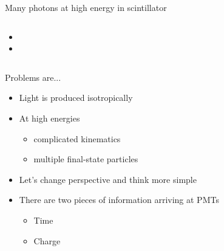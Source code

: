 \documentclass[14pt]{beamer}
\begin{document}
\begin{frame}{Many photons at high energy in scintillator}
\begin{columns}[T]
\begin{block}{}
			\begin{itemize}
				\item<3-> {\fontsize{10pt}{10pt}}
				\item<4-> {\fontsize{10pt}{10pt}\selectfont{fitters must to be
					robust against these statistical outliers}}
			\end{itemize}
		\end{block}
	\end{columns}
\end{frame}

\begin{frame}{Problems are...}
	\begin{itemize}
		\item<1-> Light is produced isotropically
		\item<2-> At high energies
		\begin{itemize}
			\item<2-> complicated kinematics
			\item<2-> multiple final-state particles
		\end{itemize}
	\item<3-> {\color{blue}Let's change perspective and think more simple}
	\item<4-> {\color{blue}There are two pieces of information arriving at PMTs}
		\begin{itemize}
			\item<5-> {\color{blue}Time}
			\item<5-> {\color{blue}Charge}
		\end{itemize}
	\end{itemize}
\end{frame}
\end{document}
